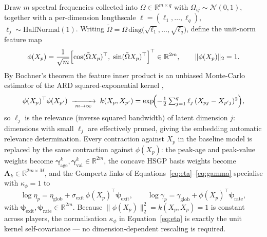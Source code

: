 Draw $m$ spectral frequencies collected into $\Omega \in \mathbb{R}^{m \times q}$ with $\Omega_{ij} \sim \mathcal{N}(0,1)$, together with a per-dimension lengthscale $\ell = (\ell_1, \dots, \ell_q)$, $\ell_j \sim \mathrm{HalfNormal}(1)$.  Writing $\tilde\Omega = \Omega\,\mathrm{diag}\!\bigl(\sqrt{\ell_1}, \dots, \sqrt{\ell_q}\bigr)$, define the unit-norm feature map
\begin{equation}
  \phi(X_p) = \frac{1}{\sqrt{m}}\Bigl[\cos(\tilde\Omega X_p)^\top,\; \sin(\tilde\Omega X_p)^\top\Bigr]^\top \in \mathbb{R}^{2m},
  \qquad \lVert \phi(X_p) \rVert_2 = 1.
  \label{eq:rff_features}
\end{equation}
By Bochner's theorem the feature inner product is an unbiased Monte-Carlo estimator of the ARD squared-exponential kernel \cite{rffs},
\begin{equation}
  \phi(X_p)^\top \phi(X_{p'}) \;\xrightarrow[\;m \to \infty\;]{}\;
  k(X_p, X_{p'}) = \exp\!\Bigl(-\tfrac{1}{2}\textstyle\sum_{j=1}^{q} \ell_j\,(X_{pj} - X_{p'j})^2\Bigr),
  \label{eq:rff_kernel}
\end{equation}
so $\ell_j$ is the relevance (inverse squared bandwidth) of latent dimension $j$: dimensions with small $\ell_j$ are effectively pruned, giving the embedding automatic relevance determination.  Every contraction against $X_p$ in the baseline model is replaced by the same contraction against $\phi(X_p)$: the peak-age and peak-value weights become $\boldsymbol\gamma^k_{\text{age}}, \boldsymbol\gamma^k_{\text{val}} \in \mathbb{R}^{2m}$, the concave HSGP basis weights become $\mathbf{A}_k \in \mathbb{R}^{2m \times M}$, and the Gompertz links of Equations~\ref{eq:eta}--\ref{eq:gamma} specialise with $\kappa_\phi = 1$ to
\begin{equation}
  \log \eta_p = \eta_{\text{glob}} + \sigma_{\text{exit}}\,\phi(X_p)^\top \boldsymbol\psi_{\text{exit}},
  \qquad
  \log \gamma_p = \gamma_{\text{glob}} + \phi(X_p)^\top \boldsymbol\psi_{\text{rate}},
  \label{eq:rff_surv}
\end{equation}
with $\boldsymbol\psi_{\text{exit}}, \boldsymbol\psi_{\text{rate}} \in \mathbb{R}^{2m}$.  Because $\lVert \phi(X_p) \rVert_2^2 = k(X_p, X_p) = 1$ is constant across players, the normalisation $\kappa_\phi$ in Equation~\ref{eq:eta} is exactly the unit kernel self-covariance --- no dimension-dependent rescaling is required.

